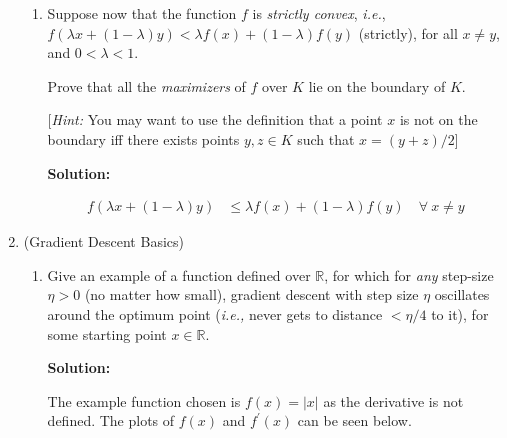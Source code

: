 \documentclass[12pt]{article}
\newcommand{\abs}[1]{\left| #1 \right|}
\newcommand{\R}{\mathbb{R}}
\renewcommand{\P}[1]{\left( #1 \right)}
\begin{document}
\begin{enumerate}
\begin{enumerate}
    \item Suppose now that the function $f$ is {\em strictly convex}, {\em i.e.}, $f(\lambda x + (1 - \lambda)y) < \lambda f(x) + (1 - \lambda) f(y)$ (strictly), for all $x \neq y$, and $0 < \lambda < 1$. 

Prove that all the {\em maximizers} of $f$ over $K$ lie on the boundary of $K$. 

[{\em Hint:} You may want to use the definition that a point $x$ is not on the boundary iff there exists points $y,z \in K$ such that $x = (y+z)/2$]

      {\bf Solution:}

\begin{align*}
f\P{\lambda x + (1-\lambda)y} &\leq \lambda f(x) + (1-\lambda)f(y)\quad \forall\ x\neq y
\end{align*}
  \end{enumerate}

\item (Gradient Descent Basics)

\begin{enumerate}
  \item Give an example of a function defined over $\R$, for which for {\em any} step-size $\eta > 0$ (no matter how small), gradient descent with step size $\eta$ oscillates around the optimum point ({\em i.e.,} never gets to distance $< \eta / 4$ to it), for some starting point $x \in \R$.

      {\bf Solution:}

The example function chosen is $f(x) = \abs{x}$ as the derivative is not defined. The plots of $f(x)$ and $f^{\prime}(x)$ can be seen below.

\hspace{-2.5em}
\hspace{-2.5em}
{ %
\pgfplotsset{ymin=-1.25, ymax=1.25}
}


\end{enumerate}
\end{enumerate}
\end{document}

